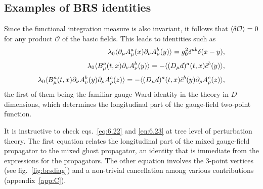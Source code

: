 \subsection{Examples of BRS identities}

Since the functional integration measure is also invariant, it follows
that $\langle\delta\mathcal{O}\rangle=0$ for any product
$\mathcal{O}$ of the basic fields.
This leads to identities such as
\begin{align}
   \lambda_0\langle
   \partial_{\mu}A_{\mu}^a(x)\partial_{\nu}A_{\nu}^b(y)
   \rangle=g_0^2\delta^{ab}\delta(x-y),
   \label{eq:6.21}\\[3pt]
   \lambda_0\langle B^a_{\mu}(t,x)\partial_{\nu}A^b_{\nu}(y)\rangle=
   -\langle(D_{\mu}d)^a(t,x)\bar{c}^b(y)\rangle,
   \label{eq:6.22}\\[3pt]
   \lambda_0\langle
   B^a_{\mu}(t,x)\partial_{\nu}A^b_{\nu}(y)\partial_{\rho}A^c_{\rho}(z)
   \rangle=
   -\langle(D_{\mu}d)^a(t,x)\bar{c}^b(y)\partial_{\rho}A^c_{\rho}(z)\rangle,
   \label{eq:6.23}
\end{align}
the first of them being the familiar gauge Ward identity in the
theory in $D$ dimensions,
which determines the longitudinal part of the gauge-field
two-point function.

It is instructive to check eqs.~\eqref{eq:6.22} and \eqref{eq:6.23}
at tree level of perturbation theory. The first
equation relates the longitudinal part of the mixed
gauge-field propagator to the mixed ghost propagator, an identity
that is immediate from the expressions for the propagators.
The other equation involves the $3$-point vertices
(see fig.~\ref{fig:brsdiag}) and a non-trivial
cancellation among various contributions (appendix~\ref{app:C}).

